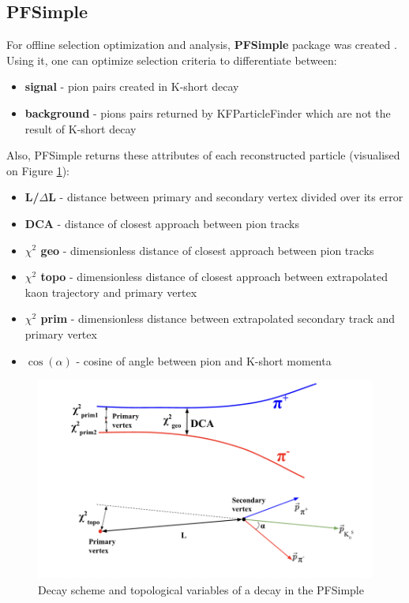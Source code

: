 \subsection{PFSimple}
For offline selection optimization and analysis, \textbf{PFSimple} package was created \cite{lubynets}. Using it, one can optimize selection criteria to differentiate between:
\begin{itemize}
    \item \textbf{signal} - pion pairs created in K-short decay
    \item \textbf{background} - pions pairs returned by KFParticleFinder which are not the result of K-short decay
\end{itemize}
Also, PFSimple returns these attributes of each reconstructed particle (visualised on Figure \ref{pfsimple}):
\begin{itemize}
    \item \textbf{L/$\Delta$L} - distance between primary and secondary vertex divided over its error
    \item \textbf{DCA} - distance of closest approach between pion tracks
    \item \textbf{$\chi^2$ geo} - dimensionless distance of closest approach between pion tracks
    \item \textbf{$\chi^2$ topo} - dimensionless distance of closest approach between extrapolated kaon trajectory and primary vertex
    \item \textbf{$\chi^2$ prim} - dimensionless distance between extrapolated secondary track and primary vertex
    \item \textbf{$\cos(\alpha)$} - cosine of angle between pion and K-short momenta
\end{itemize}
\begin{figure}[H]
    \centering
    \includegraphics[width=.9\textwidth]{img/pfsimple_variables.png}
    \caption{Decay scheme and topological variables of a \PKshort decay in the PFSimple}
    \label{pfsimple}
\end{figure}
